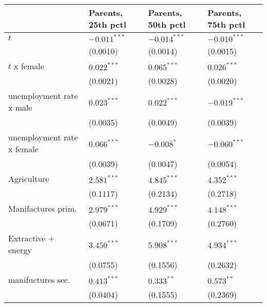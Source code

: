 \begin{tabular}{llll}
\toprule
{} & Parents, 25th pctl & Parents, 50th pctl & Parents, 75th pctl \\
\midrule
$t$                                                &     $-0.011^{***}$ &     $-0.014^{***}$ &     $-0.010^{***}$ \\
                                                   &           (0.0010) &           (0.0014) &           (0.0015) \\
$t$ x female                                       &      $0.022^{***}$ &      $0.065^{***}$ &      $0.026^{***}$ \\
                                                   &           (0.0021) &           (0.0028) &           (0.0020) \\
unemployment rate x male                           &      $0.023^{***}$ &      $0.022^{***}$ &     $-0.019^{***}$ \\
                                                   &           (0.0035) &           (0.0049) &           (0.0039) \\
unemployment rate x female                         &      $0.066^{***}$ &         $-0.008^*$ &     $-0.060^{***}$ \\
                                                   &           (0.0039) &           (0.0047) &           (0.0054) \\
Agriculture                                        &      $2.581^{***}$ &      $4.845^{***}$ &      $4.352^{***}$ \\
                                                   &           (0.1117) &           (0.2134) &           (0.2718) \\
Manifactures prim.                                 &      $2.979^{***}$ &      $4.929^{***}$ &      $4.148^{***}$ \\
                                                   &           (0.0671) &           (0.1709) &           (0.2760) \\
Extractive + energy                                &      $3.450^{***}$ &      $5.908^{***}$ &      $4.934^{***}$ \\
                                                   &           (0.0755) &           (0.1556) &           (0.2632) \\
manifuctures sec.                                  &      $0.413^{***}$ &       $0.333^{**}$ &       $0.573^{**}$ \\
                                                   &           (0.0404) &           (0.1555) &           (0.2369) \\

\end{tabular}
